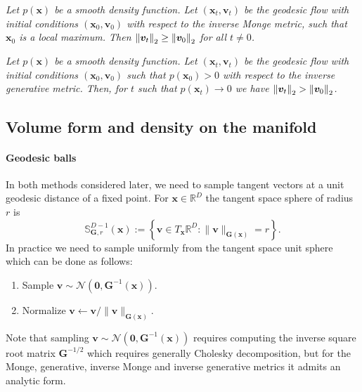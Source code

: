 \begin{observation}[Paper II]
\emph{
    Let $p(\boldsymbol{x})$ be a smooth density function. Let $(\boldsymbol{x}_t, \boldsymbol{v}_t)$ be the geodesic flow with initial conditions $(\boldsymbol{x}_0,\boldsymbol{v}_0)$  with respect to the inverse Monge metric, such that $\boldsymbol{x}_0$ is a local maximum.
    Then $\norm{\boldsymbol{v}_t}_{2}\geq \norm{\boldsymbol{v}_0}_{2}$ 
    for all $t\neq 0$.
    } \label{obs:invmonge}
\end{observation}
\begin{observation}[Paper II]
\emph{
    Let $p(\boldsymbol{x})$ be a smooth density function. Let $(\boldsymbol{x}_t, \boldsymbol{v}_t)$ be the geodesic flow with initial conditions $(\boldsymbol{x}_0,\boldsymbol{v}_0)$ such that $p(\boldsymbol{x}_0)>0$ with respect to the inverse generative metric. Then, for $t$ such that $p(\boldsymbol{x}_t) \to 0$ we have $\norm{\boldsymbol{v}_t}_{2}>\norm{\boldsymbol{v}_0}_{2}$.
    } \label{obs:invgen}
\end{observation}


 
\subsection{Volume form and density on the manifold}

\paragraph{Geodesic balls}
In both methods considered later,  we need to sample tangent vectors at a unit geodesic distance of a fixed point. 
For $\boldsymbol{x}\in\mathbb{R}^D$ the tangent space sphere of radius $r$ is
\begin{equation*}
\mathbb{S}^{D-1}_{\mathbf{G},r}(\boldsymbol{x})
:=
\left\{
\boldsymbol{v}\in T_{\boldsymbol{x}}\mathbb{R}^D :
\|\boldsymbol{v}\|_{\mathbf{G}(\boldsymbol{x})}= r
\right\}.
\end{equation*}
In practice we need to sample uniformly from the tangent space unit sphere which can be done as follows:
\begin{enumerate}
    \item Sample $\boldsymbol{v} \sim \mathcal{N}(\boldsymbol{0}, \mathbf{G}^{-1}(\boldsymbol{x}))$.
    \item Normalize $\boldsymbol{v} \leftarrow {\boldsymbol{v}}/{\|\boldsymbol{v}\|_{\mathbf{G}(\boldsymbol{x})}}$.
\end{enumerate}
Note that sampling $\boldsymbol{v} \sim \mathcal{N}(\boldsymbol{0}, \mathbf{G}^{-1}(\boldsymbol{x}))$ requires computing the inverse square root matrix $\mathbf{G}^{-1/2}$ which requires generally Cholesky decomposition, but for the Monge, generative, inverse Monge and inverse generative metrics it admits an analytic form. 

